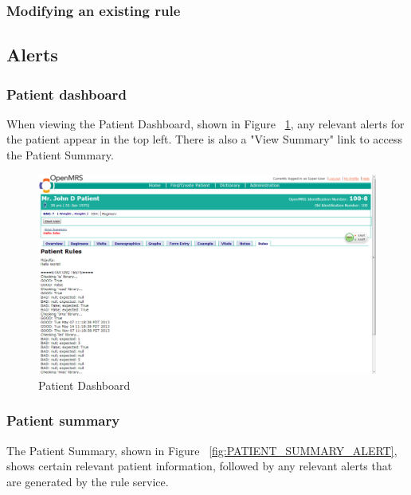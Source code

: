 \documentclass[12pt,letterpaper]{article}
\begin{document}
\subsubsection{Modifying an existing rule}

\subsection{Alerts}

\subsubsection{Patient dashboard}

When viewing the Patient Dashboard, shown in Figure 
~\ref{fig:PATIENT_DASHBOARD_ALERT}, any relevant alerts for 
the patient appear in the top left. There is also a "View Summary" 
link to access the Patient Summary.

\begin{figure}\begin{center}
\includegraphics[width=6.5in]{dashboard2.png}
\end{center}
\caption{Patient Dashboard} \label{fig:PATIENT_DASHBOARD_ALERT}
\end{figure}

\subsubsection{Patient summary}

The Patient Summary, shown in Figure 
~\ref{fig:PATIENT_SUMMARY_ALERT}, shows certain relevant 
patient information, followed by any relevant alerts that are 
generated by the rule service.
\end{document}
